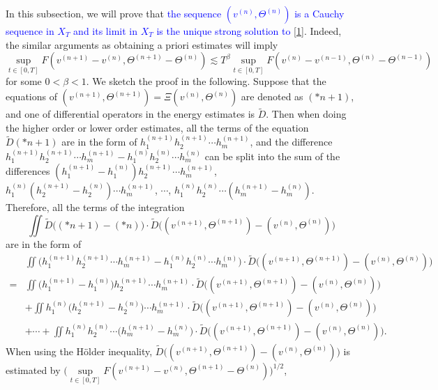\documentclass[12pt,a4paper]{amsart}
\numberwithin{equation}{section}
\theoremstyle{plain}
\theoremstyle{definition}
\begin{document}
\iffalse 
In this subsection, we will prove that \textcolor{blue}{the sequence $(v^{(n)},\Theta^{(n)})$ is a Cauchy sequence in $X_T$ and its limit in $X_T$ is the unique strong solution to \eqref{1}}.
Indeed, the similar arguments as obtaining a priori estimates will imply 
\begin{equation}
\label{Cauchy sequence}
	\sup\limits_{t\in[0,T]}F(v^{(n+1)}-v^{(n)},\Theta^{(n+1)}-\Theta^{(n)})\lesssim  T^{\beta}\sup\limits_{t\in[0,T]}F(v^{(n)}-v^{(n-1)},\Theta^{(n)}-\Theta^{(n-1)})
\end{equation}
for some $0<\beta<1$.
We sketch the proof in the following.
Suppose that the equations of $(v^{(n+1)},\Theta^{(n+1)})=\Xi(v^{(n)},\Theta^{(n)})$ are denoted as $(*n+1)$, and one of differential operators in the energy estimates is $\widetilde{D}$. Then when doing the higher order or lower order estimates, all the terms of the equation $\widetilde{D} (*n+1)$ are in the form of  $h_1^{(n+1)}h_2^{(n+1)}\cdots h_m^{(n+1)}$, and the difference  $h_1^{(n+1)}h_2^{(n+1)}\cdots h_m^{(n+1)}-h_1^{(n)}h_2^{(n)}\cdots h_m^{(n)}$ can be split into the sum of the differences $(h_1^{(n+1)}-h_1^{(n)})h_2^{(n+1)}\cdots h_m^{(n+1)}$, $h_1^{(n)}(h_2^{(n+1)}-h_2^{(n)})\cdots h_m^{(n+1)}$, $\cdots$, $h_1^{(n)}h_2^{(n)}\cdots (h_m^{(n+1)}-h_m^{(n)})$.
Therefore, all the terms of the integration $$\iint \widetilde{D} \Big((*n+1)-(*n)\Big)\cdot \widetilde{D}\Big((v^{(n+1)},\Theta^{(n+1)})-(v^{(n)},\Theta^{(n)})\Big) $$ are in the form of
\begin{align*}
&\iint \Big(h_1^{(n+1)}h_2^{(n+1)}\cdots h_m^{(n+1)}-h_1^{(n)}h_2^{(n)}\cdots h_m^{(n)}\Big) \cdot\widetilde{D}\Big((v^{(n+1)},\Theta^{(n+1)})-(v^{(n)},\Theta^{(n)})\Big)\\
=&\iint \Big(h_1^{(n+1)}-h_1^{(n)}\Big)h_2^{(n+1)}\cdots h_m^{(n+1)} \cdot\widetilde{D}\Big((v^{(n+1)},\Theta^{(n+1)})-(v^{(n)},\Theta^{(n)})\Big)\\
&+\iint h_1^{(n)}\Big(h_2^{(n+1)}-h_2^{(n)}\Big)\cdots h_m^{(n+1)} \cdot\widetilde{D}\Big((v^{(n+1)},\Theta^{(n+1)})-(v^{(n)},\Theta^{(n)})\Big)\\
&+\cdots+\iint h_1^{(n)}h_2^{(n)}\cdots \Big(h_m^{(n+1)}-h_m^{(n)}\Big) \cdot\widetilde{D}\Big((v^{(n+1)},\Theta^{(n+1)})-(v^{(n)},\Theta^{(n)})\Big).
\end{align*}
When using the H\"{o}lder inequality, $\widetilde{D}\Big((v^{(n+1)},\Theta^{(n+1)})-(v^{(n)},\Theta^{(n)})\Big)$ is estimated by $\Big(\sup\limits_{t\in[0,T]}F(v^{(n+1)}-v^{(n)},\Theta^{(n+1)}-\Theta^{(n)})\Big)^{1/2}$,
\end{document}
